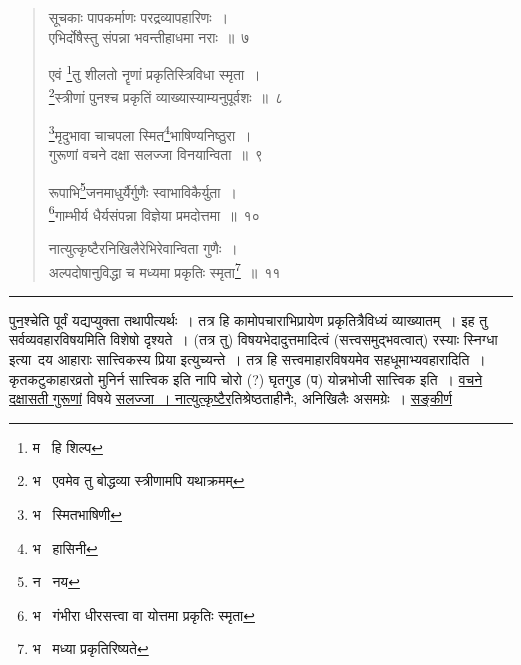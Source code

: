 \documentclass[11pt, openany]{book}
\begin{document}

\newpage
\lfoot{}

\begin{quote}
{\na सूचकाः पापकर्माणः परद्रव्यापहारिणः~।\\
एभिर्दोषैस्तु संपन्ना भवन्तीहाधमा नराः~॥~७

एवं \renewcommand{\thefootnote}{1}\footnote{म \textendash\  हि शिल्प}तु शीलतो नॄणां प्रकृतिस्त्रिविधा स्मृता~।\\
\renewcommand{\thefootnote}{2}\footnote{भ \textendash\  एवमेव तु बोद्धव्या स्त्रीणामपि यथाक्रमम्}स्त्रीणां पुनश्च प्रकृतिं व्याख्यास्याम्यनुपूर्वशः~॥~८

\renewcommand{\thefootnote}{3}\footnote{भ \textendash\  स्मितभाषिणी}मृदुभावा चाचपला स्मित\renewcommand{\thefootnote}{4}\footnote{भ \textendash\  हासिनी}भाषिण्यनिष्ठुरा~।\\
गुरूणां वचने दक्षा सलज्जा विनयान्विता~॥~९

रूपाभि\renewcommand{\thefootnote}{5}\footnote{न \textendash\  नय}जनमाधुर्यैर्गुणैः स्वाभाविकैर्युता~।\\
\renewcommand{\thefootnote}{6}\footnote{भ \textendash\  गंभीरा धीरसत्त्वा वा योत्तमा प्रकृतिः स्मृता}गाम्भीर्य धैर्यसंपन्ना विज्ञेया प्रमदोत्तमा~॥~१०

नात्युत्कृष्टैरनिखिलैरेभिरेवान्विता गुणैः~।\\
अल्पदोषानुविद्धा च मध्यमा प्रकृतिः स्मृता\renewcommand{\thefootnote}{7}\footnote{भ \textendash\  मध्या प्रकृतिरिष्यते}~॥~११}
\end{quote}

\hrule

\vspace{2mm}
\underline{पुन}श्चेति पूर्वं यद्यप्युक्ता तथापीत्यर्थः~। तत्र हि कामोपचाराभिप्रायेण प्रकृतित्रैविध्यं व्याख्यातम्~। इह तु सर्वव्यवहारविषयमिति विशेषो दृश्यते~। (तत्र तु) विषयभेदादुत्तमादित्वं (सत्त्वसमुद्भवत्वात्) रस्याः स्निग्धा इत्या\textendash\ दय आहाराः सात्त्विकस्य प्रिया इत्युच्यन्ते~। तत्र हि सत्त्वमाहारविषयमेव सहधूमाभ्यवहारादिति~। कृतकटुकाहारव्रतो मुनिर्न सात्त्विक इति नापि चोरो (?) घृतगुड (प) योन्नभोजी सात्त्विक इति~। \underline{वचने दक्षासती गुरूणां} विषये \underline{सलज्जा~। नात्युत्कृष्टैर}तिश्रेष्ठताहीनैः, अनिखिलैः असमग्रेः~। \underline{सङ्कीर्ण}

\newpage
\end{document}
